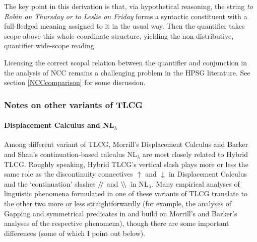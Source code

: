\documentclass[output=paper]{langsci/langscibook}
\begin{document}
\noindent The key point in this derivation is that, via hypothetical
reasoning, the string \textit{to Robin on Thursday or to Leslie on Friday}
forms a syntactic constituent with a full-fledged meaning assigned to
it in the usual way. Then the quantifier takes scope above this whole
coordinate structure, yielding the non-distributive, quantifier
wide-scope reading.

Licensing the correct scopal relation between the quantifier and
conjunction in the analysis of NCC remains a challenging problem in
the HPSG literature. See section \ref{NCCcomparison} for some
discussion.


\subsubsection{Notes on other variants of TLCG \label{sec:comparison}}

\paragraph{Displacement Calculus and NL\ensuremath{_\lambda} \label{disp}}

Among different variant of TLCG, Morrill's Displacement Calculus
\citep{morrill-ea11,morrill2011} and Barker and Shan's
continuation-based calculus NL\ensuremath{_\lambda}
\citep{barkershan2015} are most closely related to Hybrid TLCG.
Roughly speaking, Hybrid TLCG's vertical slash
\syncat{\ensuremath{\vs}} plays more or less the same role as the
discontinuity connectives $\uparrow$ and $\downarrow$ in Displacement
Calculus and the `continuation' slashes \ensuremath{/\hskip-.42ex/} and
\ensuremath{\backslash\hskip-.4ex\backslash}\ in
NL\ensuremath{_\lambda}. Many empirical analyses of linguistic
phenomena formulated in one of these variants of TLCG translate to the
other two more or less straightforwardly (for example, the analyses of
Gapping and symmetrical predicates in \citet{kubota-levine-gapping}
and \citet{kubota-levine-resp} build on Morrill's and Barker's
analyses of the respective phenomena), though there are some important
differences (some of which I point out below).
\end{document}
